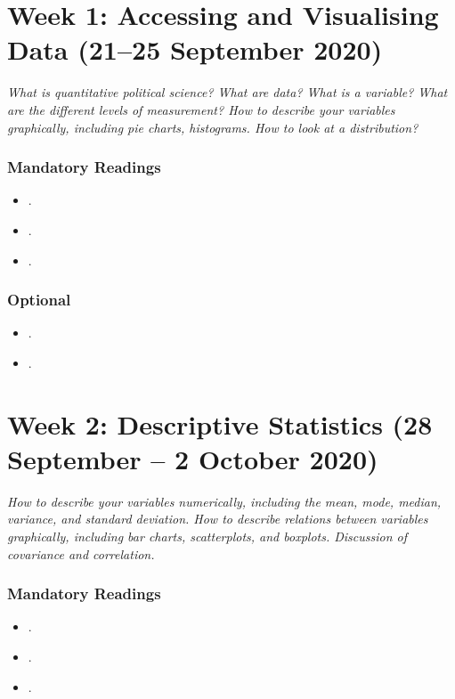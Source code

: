 \documentclass[abstract=on,parskip=full,headings=standardclasses,fontsize=11pt,paper=a4]{scrartcl}
\begin{document}
\tableofcontents

\section{Week 1: Accessing and Visualising Data (21--25 September 2020)}


\textit{What is quantitative political science? What are data? What is a variable? What are the different levels of measurement? How to describe your variables graphically, including pie charts, histograms. How to look at a distribution?}

\subsubsection*{Mandatory Readings}
\begin{itemize}
\item {}.
\item {}.
\item {}.
\end{itemize}

\subsubsection*{Optional}
\begin{itemize}
\item {}.
\item {}.
\end{itemize}

\section{Week 2: Descriptive Statistics (28 September -- 2 October 2020)}

\textit{How to describe your variables numerically, including the mean, mode, median, variance, and standard deviation. How to describe relations between variables graphically, including bar charts, scatterplots, and boxplots. Discussion of covariance and correlation.}

\subsubsection*{Mandatory Readings}
\begin{itemize}
\item {}.
\item {}.
\item {}.
\end{itemize}
\end{document}
